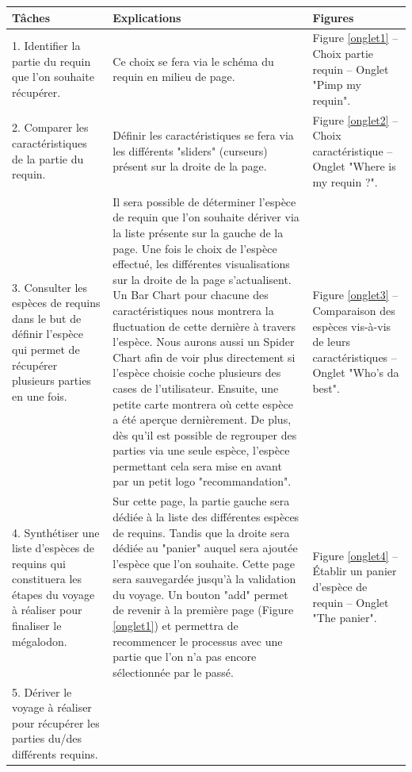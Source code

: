 \documentclass{article}
\begin{document}
\begin{center}
	\begin{tabular}{|p{3.5cm}|p{7cm}|p{3.5cm}|}
		\hline
		Tâches
		 &
		Explications
		 &
		Figures
		\\\hline
		1. Identifier la partie du requin que l’on souhaite récupérer.
		 &
		Ce choix se fera via le schéma du requin en milieu de page.
		 &

		Figure \ref{onglet1} – Choix partie requin – Onglet "Pimp my requin".
		\\\hline
		2. Comparer les caractéristiques de la partie du requin.
		 &
		Définir les caractéristiques se fera via les différents "sliders" (curseurs) présent sur la droite de la page.
		 &
		Figure \ref{onglet2} – Choix caractéristique – Onglet "Where is my requin ?".
		\\\hline
		3. Consulter les espèces de requins dans le but de définir l’espèce qui permet de récupérer plusieurs parties en une fois.
		 &
		Il sera possible de déterminer l’espèce de requin que l’on souhaite dériver via la liste présente sur la gauche de la page. Une fois le choix de l’espèce effectué, les différentes visualisations sur la droite de la page s'actualisent. Un Bar Chart pour chacune des caractéristiques nous montrera la fluctuation de cette dernière à travers l'espèce. Nous aurons aussi un Spider Chart afin de voir plus directement si l'espèce choisie coche plusieurs des cases de l'utilisateur. Ensuite, une petite carte montrera où cette espèce a été aperçue dernièrement. De plus, dès qu'il est possible de regrouper des parties via une seule espèce, l'espèce permettant cela sera mise en avant par un petit logo "recommandation".
		 &
		Figure \ref{onglet3} – Comparaison des espèces vis-à-vis de leurs caractéristiques – Onglet "Who's da best".
		\\\hline
		4. Synthétiser une liste d’espèces de requins qui constituera les étapes du voyage à réaliser pour finaliser le mégalodon.
		 &
		Sur cette page, la partie gauche sera dédiée à la liste des différentes espèces de requins. Tandis que la droite sera dédiée au "panier" auquel sera ajoutée l’espèce que l’on souhaite. Cette page sera sauvegardée jusqu’à la validation du voyage. Un bouton "add" permet de revenir à la première page (Figure \ref{onglet1}) et permettra de recommencer le processus avec une partie que l’on n'a pas encore sélectionnée par le passé.
		 &
		Figure \ref{onglet4} – Établir un panier d’espèce de requin – Onglet "The panier".
		\\\hline
		5. Dériver le voyage à réaliser pour récupérer les parties du/des différents requins.

\end{tabular}
\end{center}
\end{document}
